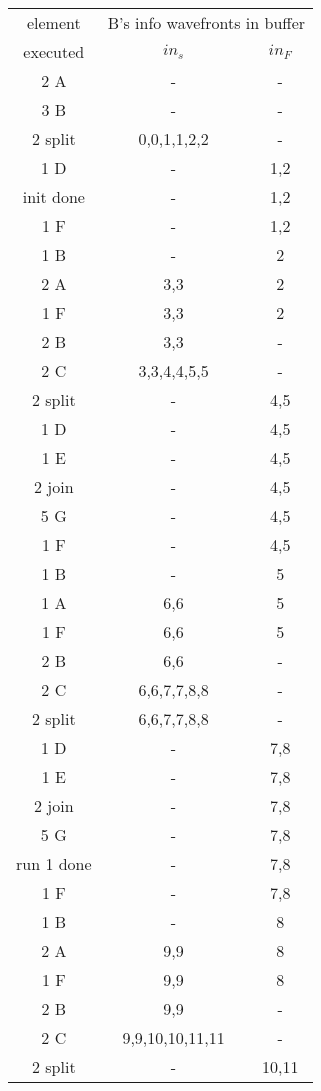 \begin{table}
\centering \scriptsize
\begin{tabular}{|c|c|c|}
\hline element & \multicolumn{2}{c|}{B's info wavefronts in buffer}\\
\cline{2-3} executed & $in_s$ & $in_F$ \\
\hline 2 A & - & - \\
\hline 3 B & - & - \\
\hline 2 split & 0,0,1,1,2,2 & - \\
\hline 1 D & - & 1,2 \\
\hline init done & - & 1,2 \\
\hline 1 F & - & 1,2 \\
\hline 1 B & - & 2 \\
\hline 2 A & 3,3 & 2 \\
\hline 1 F & 3,3 & 2 \\
\hline 2 B & 3,3 & - \\
\hline 2 C & 3,3,4,4,5,5 & - \\
\hline 2 split & - & 4,5 \\
\hline 1 D & - & 4,5 \\
\hline 1 E & - & 4,5 \\
\hline 2 join & - & 4,5 \\
\hline 5 G & - & 4,5 \\
\hline 1 F & - & 4,5 \\
\hline 1 B & - & 5 \\
\hline 1 A & 6,6 & 5 \\
\hline 1 F & 6,6 & 5 \\
\hline 2 B & 6,6 & - \\
\hline 2 C & 6,6,7,7,8,8 & - \\
\hline 2 split & 6,6,7,7,8,8 & - \\
\hline 1 D & - & 7,8 \\
\hline 1 E & - & 7,8 \\
\hline 2 join & - & 7,8 \\
\hline 5 G & - & 7,8 \\
\hline run 1 done & - & 7,8 \\
\hline 1 F & - & 7,8 \\
\hline 1 B & - & 8 \\
\hline 2 A & 9,9 & 8 \\
\hline 1 F & 9,9 & 8 \\
\hline 2 B & 9,9 & - \\
\hline 2 C & 9,9,10,10,11,11 & - \\
\hline 2 split & - & 10,11 \\

\end{tabular}
\end{table}
